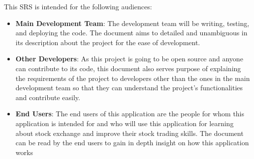 \documentclass[12 pt, a4paper]{report}
\begin{document}
	This SRS is intended for the following audiences:
	\begin{itemize}
		\item \textbf{Main Development Team}: The development team will be writing, testing, and deploying the code. The document aims to detailed and unambiguous in its description about the project for the ease of development.
		\item \textbf{Other Developers}: As this project is going to be open source and anyone can contribute to its code, this document also serves purpose of explaining the requirements of the project to developers other than the ones in the main development team so that they can understand the project's functionalities and contribute easily.
		\item \textbf{End Users}: The end users of this application are the people for whom this application is intended for and who will use this application for learning about stock exchange and improve their stock trading skills. The document can be read by the end users to gain in depth insight on how this application works
	\end{itemize}
\end{document}
